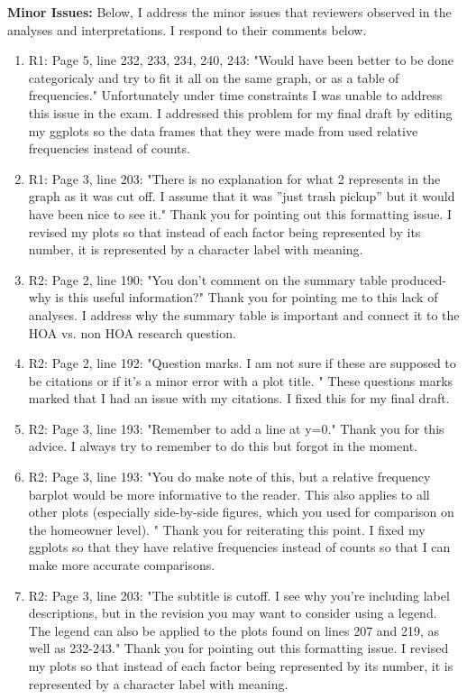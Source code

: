 \documentclass{article}
\begin{document}
\textbf{Minor Issues:} Below, I address the minor issues that reviewers observed in the analyses and interpretations. I respond to their comments below.
\begin{enumerate}
  \item R1: Page 5, line 232, 233, 234, 240, 243: "Would have been better to be done categoricaly and try to fit it all on the same graph, or as a table of frequencies." Unfortunately under time constraints I was unable to address this issue in the exam. I addressed this problem for my final draft by editing my ggplots so the data frames that they were made from used relative frequencies instead of counts. 
  \item R1: Page 3, line 203: "There is no explanation for what 2 represents in the graph as it was cut off. I assume 
that it was ”just trash pickup” but it would have been nice to see it." Thank you for pointing out this formatting issue. I revised my plots so that instead of each factor being represented by its number, it is represented by a character label with meaning. 
  \item R2: Page 2, line 190: "You don’t comment on the summary table produced- why is this useful information?" Thank you for pointing me to this lack of analyses. I address why the summary table is important and connect it to the HOA vs. non HOA research question.  
  \item R2: Page 2, line 192: "Question marks. I am not sure if these are supposed to be citations or if it’s a minor 
error with a plot title. " These questions marks marked that I had an issue with my citations. I fixed this for my final draft. 
  \item R2: Page 3, line 193: "Remember to add a line at y=0." Thank you for this advice. I always try to remember to do this but forgot in the moment. 
  \item R2: Page 3, line 193: "You do make note of this, but a relative frequency barplot would be more informative to the reader. This also applies to all other plots (especially side-by-side figures, which you used for comparison on the homeowner level). " Thank you for reiterating this point. I fixed my ggplots so that they have relative frequencies instead of counts so that I can make more accurate comparisons. 
  \item R2: Page 3, line 203: "The subtitle is cutoff. I see why you’re including label descriptions, but in the revision you may want to consider using a legend. The legend can also be applied to the plots found on lines 207 and 219, as well as 232-243." Thank you for pointing out this formatting issue. I revised my plots so that instead of each factor being represented by its number, it is represented by a character label with meaning. 

\end{enumerate}
\end{document}
